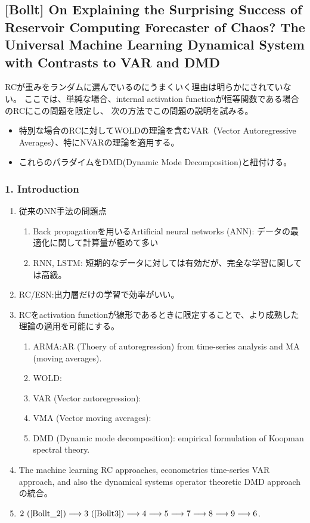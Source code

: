 \subsection{[Bollt] On Explaining the Surprising Success of Reservoir Computing Forecaster of Chaos?
The Universal Machine Learning Dynamical System with Contrasts to VAR and DMD
}\label{Bollt_paper}

RCが重みをランダムに選んでいるのにうまくいく理由は明らかにされていない。
ここでは、単純な場合、internal activation functionが恒等関数である場合のRCにこの問題を限定し、
次の方法でこの問題の説明を試みる。

\begin{itemize}
    \item 特別な場合のRCに対してWOLDの理論を含むVAR（Vector Autoregressive Averages）、特にNVARの理論を適用する。
    \item これらのパラダイムをDMD(Dynamic Mode Decomposition)と紐付ける。
\end{itemize}

\subsubsection{1. Introduction}\label{Bollt_1}
\begin{enumerate}
    \item 従来のNN手法の問題点
    \begin{enumerate}
        \item Back propagationを用いるArtificial neural networks (ANN): データの最適化に関して計算量が極めて多い
        \item RNN, LSTM: 短期的なデータに対しては有効だが、完全な学習に関しては高級。
    \end{enumerate}
    \item RC/ESN:出力層だけの学習で効率がいい。
    \item RCをactivation functionが線形であるときに限定することで、より成熟した理論の適用を可能にする。
    \begin{enumerate}
        \item ARMA:AR (Thoery of autoregression) from time-series analysis and MA (moving averages).
        \item WOLD: 
        \item VAR (Vector autoregression): 
        \item VMA (Vector moving averages): 
        \item DMD (Dynamic mode decomposition): empirical formulation of Koopman spectral theory.
    \end{enumerate}
    \item The machine learning RC approaches, econometrics time-series VAR approach, and also the dynamical systems operator theoretic DMD approachの統合。
    \item $2\ (\ref{Bollt_2}) \longrightarrow3\ (\ref{Bollt3})\longrightarrow4\longrightarrow5\longrightarrow7\longrightarrow8\longrightarrow9\longrightarrow6$.
\end{enumerate}

